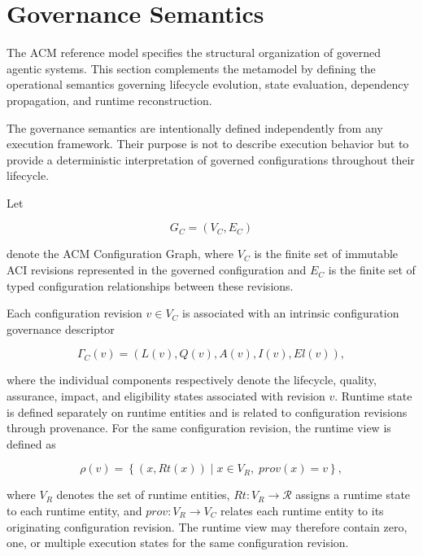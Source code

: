 \documentclass[10pt]{article}
\begin{document}
\section{Governance Semantics}
\label{sec:governance_semantics}

The ACM reference model specifies the structural organization of governed agentic systems. This section complements the metamodel by defining the operational semantics governing lifecycle evolution, state evaluation, dependency propagation, and runtime reconstruction.

The governance semantics are intentionally defined independently from any execution framework. Their purpose is not to describe execution behavior but to provide a deterministic interpretation of governed configurations throughout their lifecycle.

Let

\begin{equation}
	G_C=(V_C,E_C)
	\label{eq:configuration_graph}
\end{equation}

denote the ACM Configuration Graph, where $V_C$ is the finite set of immutable ACI revisions represented in the governed configuration and
$E_C$ is the finite set of typed configuration relationships between these revisions.

Each configuration revision $v\in V_C$ is associated with an intrinsic
configuration governance descriptor

\begin{equation}
	\Gamma_C(v)=
	\left(
	L(v),
	Q(v),
	A(v),
	I(v),
	El(v)
	\right),
	\label{eq:governance_descriptor}
\end{equation}

where the individual components respectively denote the lifecycle, quality, assurance, impact, and eligibility states associated with revision $v$.
Runtime state is defined separately on runtime entities and is related to configuration revisions through provenance.
For the same configuration revision, the runtime view is defined as

\begin{equation}
	\rho(v)
	=
	\left\{
	(x,Rt(x))
	\mid
	x\in V_R,\;
	prov(x)=v
	\right\},
	\label{eq:runtime_view}
\end{equation}

where $V_R$ denotes the set of runtime entities,
$Rt:V_R\rightarrow\mathcal{R}$ assigns a runtime state to each runtime entity, and $prov:V_R\rightarrow V_C$ relates each runtime entity to its originating configuration revision. The runtime view may therefore contain zero, one, or multiple execution states for the same configuration revision.
\end{document}
